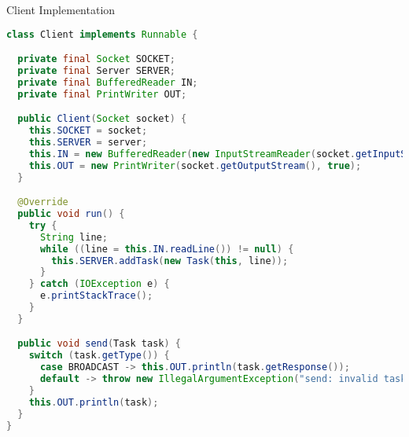 \begin{cl}{Client Implementation}
\begin{lstlisting}[language=Java]
class Client implements Runnable {

  private final Socket SOCKET;
  private final Server SERVER;
  private final BufferedReader IN;
  private final PrintWriter OUT;

  public Client(Socket socket) {
    this.SOCKET = socket;
    this.SERVER = server;
    this.IN = new BufferedReader(new InputStreamReader(socket.getInputStream()));
    this.OUT = new PrintWriter(socket.getOutputStream(), true);
  }

  @Override
  public void run() {
    try {
      String line;
      while ((line = this.IN.readLine()) != null) {
        this.SERVER.addTask(new Task(this, line));
      }
    } catch (IOException e) {
      e.printStackTrace();
    }
  }

  public void send(Task task) {
    switch (task.getType()) {
      case BROADCAST -> this.OUT.println(task.getResponse());
      default -> throw new IllegalArgumentException("send: invalid task type " + task);
    }
    this.OUT.println(task);
  }
}
\end{lstlisting}
\end{cl}
